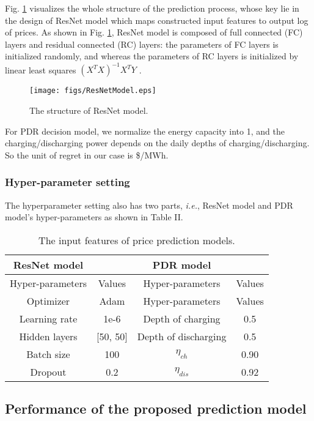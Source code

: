 \documentclass[journal]{IEEEtran}
\begin{document}
Fig. \ref{structure} visualizes the whole structure of the prediction process, whose key lie in the design of ResNet model which maps constructed input features to output log of prices. As shown in Fig. \ref{structure}, ResNet model is composed of full connected (FC) layers and residual connected (RC) layers: the parameters of FC layers is initialized randomly, and whereas the parameters of RC layers is initialized by linear least squares $(X^T X)^{-1} X^T Y$  \cite{Rencher2012}.
\begin{figure}[ht]
  \centering
  \texttt{[image: figs/ResNetModel.eps]}
  \caption{The structure of ResNet model.}
  \label{structure}
\end{figure}

For PDR decision model, we normalize the energy capacity into 1, and the charging/discharging power depends on the daily depths of charging/discharging. So the unit of regret in our case is \$/MWh.

\subsubsection{Hyper-parameter setting}
The hyperparameter setting also has two parts, \textit{i.e.}, ResNet model and PDR model's hyper-parameters as shown in Table II. 

\begin{table}[ht]
  \renewcommand{\arraystretch}{1.3}
  \centering
  \label{hyperparameters}
  \caption{The input features of price prediction models.}
  \begin{tabular}{cc|cc}
    \hline
    \bfseries{ResNet model} & & \bfseries{PDR model} & \\
    \hline
     Hyper-parameters & Values & Hyper-parameters & Values \\
    \hline
     Optimizer & Adam & Hyper-parameters & Values \\
     Learning rate & 1e-6 & Depth of charging & 0.5  \\
     Hidden layers & [50, 50] & Depth of discharging & 0.5 \\
     Batch size& 100 & $\eta_{ch}$ & 0.90 \\
     Dropout & 0.2 & $\eta_{dis}$ & 0.92 \\
    \hline
  \end{tabular}
\end{table}

\subsection{Performance of the proposed prediction model}
\end{document}
